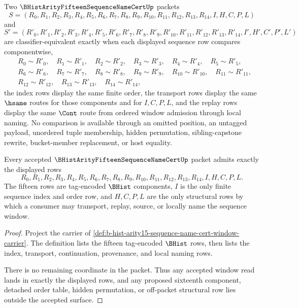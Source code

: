 \begin{definition}
\label{def:b-hist-arity15-sequence-name-cert-window-classifier}
Two $\BHistArityFifteenSequenceNameCertUp$ packets
$$
S=(R_0,R_1,R_2,R_3,R_4,R_5,R_6,R_7,R_8,R_9,R_{10},R_{11},R_{12},R_{13},R_{14},I,H,C,P,L)
$$
and
$$
S'=(R'_0,R'_1,R'_2,R'_3,R'_4,R'_5,R'_6,R'_7,R'_8,R'_9,R'_{10},R'_{11},R'_{12},R'_{13},R'_{14},I',H',C',P',L')
$$
are classifier-equivalent exactly when each displayed sequence row compares componentwise,
$$
\begin{aligned}
&R_0 \sim R'_0,\quad R_1 \sim R'_1,\quad R_2 \sim R'_2,\quad R_3 \sim R'_3,\quad R_4 \sim R'_4,\quad R_5 \sim R'_5,\\
&R_6 \sim R'_6,\quad R_7 \sim R'_7,\quad R_8 \sim R'_8,\quad R_9 \sim R'_9,\quad R_{10} \sim R'_{10},\quad R_{11} \sim R'_{11},\\
&R_{12} \sim R'_{12},\quad R_{13} \sim R'_{13},\quad R_{14} \sim R'_{14},
\end{aligned}
$$
the index rows display the same finite order, the transport rows display the same $\hsame$ routes for those components and for $I,C,P,L$, and the replay rows display the same $\Cont$ route from ordered window admission through local naming. No comparison is available through an omitted position, an untagged payload, unordered tuple membership, hidden permutation, sibling-capstone rewrite, bucket-member replacement, or host equality.
\end{definition}

\begin{theorem}
\label{thm:b-hist-arity15-sequence-name-cert-carrier-admission}
Every accepted $\BHistArityFifteenSequenceNameCertUp$ packet admits exactly the displayed rows
$$
R_0,R_1,R_2,R_3,R_4,R_5,R_6,R_7,R_8,R_9,R_{10},R_{11},R_{12},R_{13},R_{14},I,H,C,P,L.
$$
The fifteen rows are tag-encoded $\BHist$ components, $I$ is the only finite sequence index and order row, and $H,C,P,L$ are the only structural rows by which a consumer may transport, replay, source, or locally name the sequence window.
\end{theorem}
\begin{proof}
Project the carrier of \autoref{def:b-hist-arity15-sequence-name-cert-window-carrier}. The definition lists the fifteen tag-encoded $\BHist$ rows, then lists the index, transport, continuation, provenance, and local naming rows.

There is no remaining coordinate in the packet. Thus any accepted window read lands in exactly the displayed rows, and any proposed sixteenth component, detached order table, hidden permutation, or off-packet structural row lies outside the accepted surface.
\end{proof}

